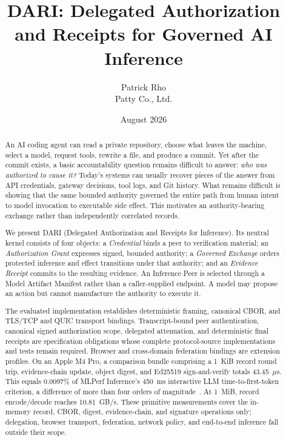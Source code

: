 \documentclass[10pt]{article}
\title{DARI: Delegated Authorization and Receipts for Governed AI Inference}
\author{Patrick Rho\\Patty Co., Ltd.}
\date{August 2026}
\newcommand{\dariname}{DARI}
\begin{document}
\maketitle

\begin{abstract}
An AI coding agent can read a private repository, choose what leaves the machine, select a model, request tools, rewrite a file, and produce a commit. Yet after the commit exists, a basic accountability question remains difficult to answer: \emph{who was authorized to cause it?} Today's systems can usually recover pieces of the answer from API credentials, gateway decisions, tool logs, and Git history. What remains difficult is showing that the same bounded authority governed the entire path from human intent to model invocation to executable side effect. This motivates an authority-bearing exchange rather than independently correlated records.

We present \dariname{} (Delegated Authorization and Receipts for Inference). Its neutral kernel consists of four objects: a \emph{Credential} binds a peer to verification material; an \emph{Authorization Grant} expresses signed, bounded authority; a \emph{Governed Exchange} orders protected inference and effect transitions under that authority; and an \emph{Evidence Receipt} commits to the resulting evidence. An Inference Peer is selected through a Model Artifact Manifest rather than a caller-supplied endpoint. A model may propose an action but cannot manufacture the authority to execute it.

The evaluated implementation establishes deterministic framing, canonical CBOR, and TLS/TCP and QUIC transport bindings. Transcript-bound peer authentication, canonical signed authorization scope, delegated attenuation, and deterministic final receipts are specification obligations whose complete protocol-source implementations and tests remain required. Browser and cross-domain federation bindings are extension profiles. On an Apple M4 Pro, a comparison bundle comprising a 1~KiB record round trip, evidence-chain update, object digest, and Ed25519 sign-and-verify totals 43.45~$\mu$s. This equals 0.0097\% of MLPerf Inference's 450~ms interactive LLM time-to-first-token criterion, a difference of more than four orders of magnitude~\cite{mlperf2025llm}. At 1~MiB, record encode/decode reaches 10.81~GB/s. These primitive measurements cover the in-memory record, CBOR, digest, evidence-chain, and signature operations only; delegation, browser transport, federation, network policy, and end-to-end inference fall outside their scope.
\end{abstract}
\end{document}
